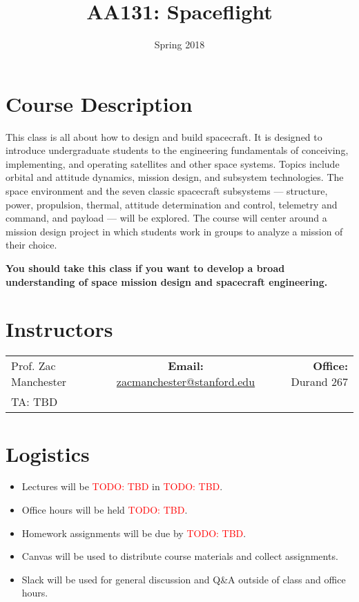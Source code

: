 \documentclass[11pt,letterpaper]{article}
\title{AA131: Spaceflight}
\author{Spring 2018}
\date{}
\newcommand{\todo}[1]{\textcolor{red}{TODO: #1}}
\begin{document}
\maketitle

\section*{Course Description}

This class is all about how to design and build spacecraft. It is designed to introduce undergraduate students to the engineering fundamentals of conceiving, implementing, and operating satellites and other space systems. Topics include orbital and attitude dynamics, mission design, and subsystem technologies. The space environment and the seven classic spacecraft subsystems --- structure, power, propulsion, thermal, attitude determination and control, telemetry and command, and payload --- will be explored. The course will center around a mission design project in which students work in groups to analyze a mission of their choice.

\medskip
\noindent
\textbf{You should take this class if you want to develop a broad understanding of space mission design and spacecraft engineering.} 

\section*{Instructors}

\begin{center}
\begin{tabular}{l c r}
	Prof. Zac Manchester & \textbf{Email:} \href{mailto:zacmanchester@stanford.edu}{zacmanchester@stanford.edu} & \textbf{Office:} Durand 267 \\
	TA: TBD
\end{tabular}
\end{center}

\section*{Logistics}

\begin{itemize}
	\item Lectures will be \todo{TBD} in \todo{TBD}.
	\item Office hours will be held \todo{TBD}.
	\item Homework assignments will be due by \todo{TBD}.
	\item Canvas will be used to distribute course materials and collect assignments.
	\item Slack will be used for general discussion and Q\&A outside of class and office hours.
\end{itemize}
\end{document}
